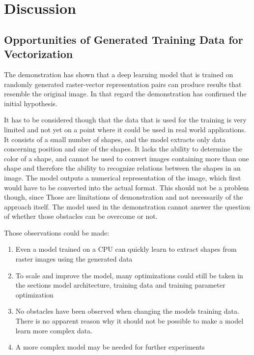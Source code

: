 \documentclass[12pt, a4paper, titlepage]{report}
\begin{document}
\chapter{Discussion}

\section{Opportunities of Generated Training Data for Vectorization}

The demonstration has shown that a deep learning model that is trained on randomly generated raster-vector representation pairs can produce results that resemble the original image. In that regard the demonstration has confirmed the initial hypothesis.

It has to be considered though that the data that is used for the training is very limited and not yet on a point where it could be used in real world applications. It consists of a small number of shapes, and the model extracts only data concerning position and size of the shapes. It lacks the ability to determine the color of a shape, and cannot be used to convert images containing more than one shape and therefore the ability to recognize relations between the shapes in an image. The model outputs a numerical representation of the image, which first would have to be converted into the actual format. This should not be a problem though, since 
Those are limitations of demonstration and not necessarily of the approach itself. The model used in the demonstration cannot answer the question of whether those obstacles can be overcome or not.

Those observations could be made:

\begin{enumerate}[label=\Roman*]
   \item Even a model trained on a CPU can quickly learn to extract shapes from raster images using the generated data
   \item To scale and improve the model, many optimizations could still be taken in the sections model architecture, training data and training parameter optimization
   \item No obstacles have been observed when changing the models training data. There is no apparent reason why it should not be possible to make a model learn more complex data.
   \item A more complex model may be needed for further experiments
\end{enumerate}
\end{document}

